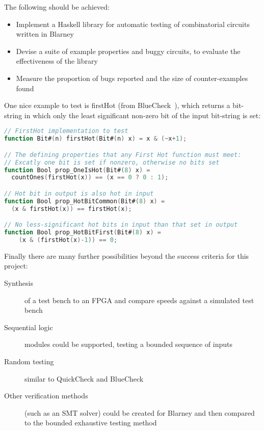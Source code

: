 \documentclass[UKenglish, 12pt]{article}
\begin{document}
The following should be achieved:

\begin{itemize}

\item Implement a Haskell library for automatic testing of combinatorial circuits written in Blarney

\item Devise a suite of example properties and buggy circuits, to
evaluate the effectiveness of the library

\item Measure the proportion of bugs reported and the size of counter-examples found

\end{itemize}


One nice example to test is firstHot (from BlueCheck~\cite{BlueCheck}), which returns a bit-string in which only the least significant non-zero bit of the input bit-string is set:
\begin{lstlisting}[language=Verilog]
// FirstHot implementation to test
function Bit#(n) firstHot(Bit#(n) x) = x & (~x+1);

// The defining properties that any First Hot function must meet:
// Excatly one bit is set if nonzero, otherwise no bits set
function Bool prop_OneIsHot(Bit#(8) x) =
  countOnes(firstHot(x)) == (x == 0 ? 0 : 1);

// Hot bit in output is also hot in input
function Bool prop_HotBitCommon(Bit#(8) x) =
  (x & firstHot(x)) == firstHot(x);

// No less-significant hot bits in input than that set in output 
function Bool prop_HotBitFirst(Bit#(8) x) =
    (x & (firstHot(x)-1)) == 0;
\end{lstlisting}

\vspace{5mm}
Finally there are many further possibilities beyond the success criteria for this
project:
\begin{description}

\item [Synthesis] of a test bench to an FPGA and compare speeds against a simulated test bench~\cite{BlueCheck}

\item [Sequential logic] modules could be supported, testing a bounded sequence of inputs~\cite{BlueCheck}

\item [Random testing] similar to QuickCheck and BlueCheck~\cite{QuickCheck, BlueCheck}

\item [Other verification methods] (such as an SMT solver) could be created for Blarney and then compared to the bounded exhaustive testing method

\end{description}
\end{document}
